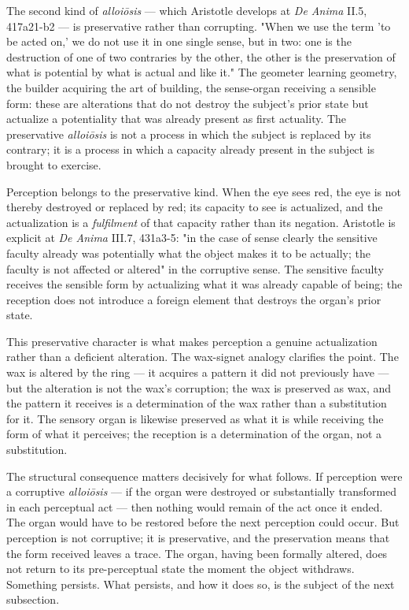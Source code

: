 \documentclass[12pt]{article}
\begin{document}
The second kind of \textit{alloiōsis} --- which Aristotle develops at \textit{De Anima} II.5, 417a21-b2 --- is preservative rather than corrupting. "When we use the term 'to be acted on,' we do not use it in one single sense, but in two: one is the destruction of one of two contraries by the other, the other is the preservation of what is potential by what is actual and like it." The geometer learning geometry, the builder acquiring the art of building, the sense-organ receiving a sensible form: these are alterations that do not destroy the subject's prior state but actualize a potentiality that was already present as first actuality. The preservative \textit{alloiōsis} is not a process in which the subject is replaced by its contrary; it is a process in which a capacity already present in the subject is brought to exercise.

Perception belongs to the preservative kind. When the eye sees red, the eye is not thereby destroyed or replaced by red; its capacity to see is actualized, and the actualization is a \textit{fulfilment} of that capacity rather than its negation. Aristotle is explicit at \textit{De Anima} III.7, 431a3-5: "in the case of sense clearly the sensitive faculty already was potentially what the object makes it to be actually; the faculty is not affected or altered" in the corruptive sense. The sensitive faculty receives the sensible form by actualizing what it was already capable of being; the reception does not introduce a foreign element that destroys the organ's prior state.

This preservative character is what makes perception a genuine actualization rather than a deficient alteration. The wax-signet analogy clarifies the point. The wax is altered by the ring --- it acquires a pattern it did not previously have --- but the alteration is not the wax's corruption; the wax is preserved as wax, and the pattern it receives is a determination of the wax rather than a substitution for it. The sensory organ is likewise preserved as what it is while receiving the form of what it perceives; the reception is a determination of the organ, not a substitution.

The structural consequence matters decisively for what follows. If perception were a corruptive \textit{alloiōsis} --- if the organ were destroyed or substantially transformed in each perceptual act --- then nothing would remain of the act once it ended. The organ would have to be restored before the next perception could occur. But perception is not corruptive; it is preservative, and the preservation means that the form received leaves a trace. The organ, having been formally altered, does not return to its pre-perceptual state the moment the object withdraws. Something persists. What persists, and how it does so, is the subject of the next subsection.
\end{document}
